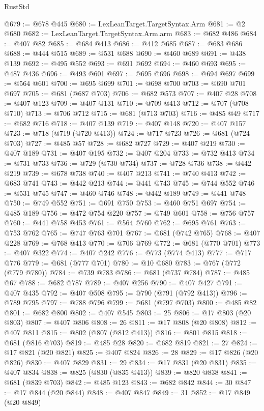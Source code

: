 \begin{lexlean}{RustStd}
\begin{coremodule}
@679 := @678 @445
@680 := LexLeanTarget.TargetSyntax.Arm
@681 := @2 @680
@682 := LexLeanTarget.TargetSyntax.Arm.arm
@683 := @682 @486
@684 := @407 @82
@685 := @684 @413
@686 := @412 @685
@687 := @683 @686
@688 := @444 @515
@689 := @531 @688
@690 := @460 @689
@691 := @438 @139
@692 := @495 @552
@693 := @691 @692
@694 := @460 @693
@695 := @487 @436
@696 := @493 @601
@697 := @695 @696
@698 := @694 @697
@699 := @564 @601
@700 := @695 @699
@701 := @698 @700
@703 := @690 @701 @697
@705 := @681 (@687 @703)
@706 := @682 @573
@707 := @407 @28
@708 := @407 @123
@709 := @407 @131
@710 := @709 @413
@712 := @707 (@708 @710)
@713 := @706 @712
@715 := @681 (@713 @703)
@716 := @485 @49
@717 := @682 @716
@718 := @407 @139
@719 := @407 @148
@720 := @407 @157
@723 := @718 (@719 (@720 @413))
@724 := @717 @723
@726 := @681 (@724 @703)
@727 := @485 @57
@728 := @682 @727
@729 := @407 @219
@730 := @407 @189
@731 := @407 @195
@732 := @407 @204
@733 := @732 @413
@734 := @731 @733
@736 := @729 (@730 @734)
@737 := @728 @736
@738 := @442 @219
@739 := @678 @738
@740 := @407 @213
@741 := @740 @413
@742 := @683 @741
@743 := @442 @213
@744 := @441 @743
@745 := @744 @552
@746 := @531 @745
@747 := @460 @746
@748 := @442 @189
@749 := @441 @748
@750 := @749 @552
@751 := @691 @750
@753 := @460 @751 @697
@754 := @485 @189
@756 := @472 @754 @220
@757 := @749 @601
@758 := @756 @757
@760 := @441 @758 @453
@761 := @564 @760
@762 := @695 @761
@763 := @753 @762
@765 := @747 @763 @701
@767 := @681 (@742 @765)
@768 := @407 @228
@769 := @768 @413
@770 := @706 @769
@772 := @681 (@770 @701)
@773 := @407 @322
@774 := @407 @242
@776 := @773 (@774 @413)
@777 := @717 @776
@779 := @681 (@777 @701)
@780 := @10 @680
@783 := @767 (@772 (@779 @780))
@784 := @739 @783
@786 := @681 (@737 @784)
@787 := @485 @67
@788 := @682 @787
@789 := @407 @256
@790 := @407 @427
@791 := @407 @435
@792 := @407 @508
@795 := @790 (@791 (@792 @413))
@796 := @789 @795
@797 := @788 @796
@799 := @681 (@797 @703)
@800 := @485 @82
@801 := @682 @800
@802 := @407 @545
@803 := 25
@806 := @17 @803 (@20 @803)
@807 := @407 @806
@808 := 26
@811 := @17 @808 (@20 @808)
@812 := @407 @811
@815 := @802 (@807 (@812 @413))
@816 := @801 @815
@818 := @681 (@816 @703)
@819 := @485 @28
@820 := @682 @819
@821 := 27
@824 := @17 @821 (@20 @821)
@825 := @407 @824
@826 := 28
@829 := @17 @826 (@20 @826)
@830 := @407 @829
@831 := 29
@834 := @17 @831 (@20 @831)
@835 := @407 @834
@838 := @825 (@830 (@835 @413))
@839 := @820 @838
@841 := @681 (@839 @703)
@842 := @485 @123
@843 := @682 @842
@844 := 30
@847 := @17 @844 (@20 @844)
@848 := @407 @847
@849 := 31
@852 := @17 @849 (@20 @849)

\end{coremodule}
\end{lexlean}
